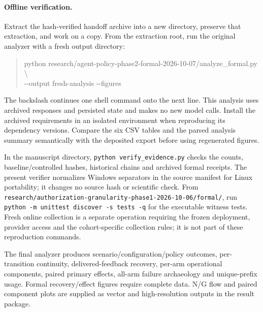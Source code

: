\documentclass[11pt,a4paper]{article}
\newcommand{\code}[1]{\nolinkurl{#1}}
\begin{document}
\paragraph{Offline verification.}
Extract the hash-verified handoff archive into a new directory, preserve that extraction, and work on a copy. From the extraction root, run the original analyzer with a fresh output directory:
\begin{quote}\footnotesize\ttfamily
python research/agent-policy-phase2-formal-2026-10-07/analyze\_formal.py \textbackslash\\
\hspace*{1em}-{}-output fresh-analysis -{}-figures
\end{quote}
The backslash continues one shell command onto the next line. This analysis uses archived responses and persisted state and makes no new model calls. Install the archived requirements in an isolated environment when reproducing its dependency versions. Compare the six CSV tables and the parsed analysis summary semantically with the deposited export before using regenerated figures.

In the manuscript directory, \texttt{python verify\_evidence.py} checks the counts, baseline/controlled hashes, historical chains and archived formal receipts. The present verifier normalizes Windows separators in the source manifest for Linux portability; it changes no source hash or scientific check. From \code{research/authorization-granularity-phase1-2026-10-06/formal/}, run \texttt{python -m unittest discover -s tests -q} for the executable witness tests. Fresh online collection is a separate operation requiring the frozen deployment, provider access and the cohort-specific collection rules; it is not part of these reproduction commands.

The final analyzer produces scenario/configuration/policy outcomes, per-transition continuity, delivered-feedback recovery, per-arm operational components, paired primary effects, all-arm failure archaeology and unique-prefix usage. Formal recovery/effect figures require complete data. N/G flow and paired component plots are supplied as vector and high-resolution outputs in the result package.
\end{document}
